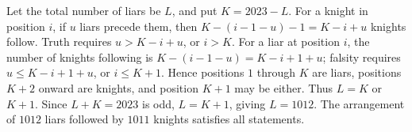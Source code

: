 Let the total number of liars be $L$, and put $K=2023-L$. For a knight in position $i$, if $u$ liars precede them, then $K-(i-1-u)-1=K-i+u$ knights follow. Truth requires $u>K-i+u$, or $i>K$. For a liar at position $i$, the number of knights following is $K-(i-1-u)=K-i+1+u$; falsity requires $u\le K-i+1+u$, or $i\le K+1$. Hence positions $1$ through $K$ are liars, positions $K+2$ onward are knights, and position $K+1$ may be either. Thus $L=K$ or $K+1$. Since $L+K=2023$ is odd, $L=K+1$, giving $\boxed{L=1012}$. The arrangement of $1012$ liars followed by $1011$ knights satisfies all statements.
